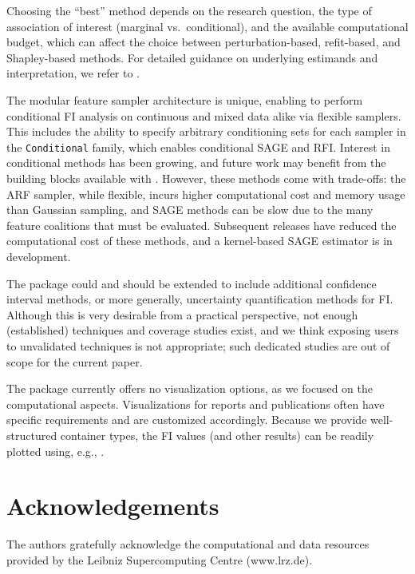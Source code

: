Choosing the ``best'' method depends on the research question, the type of association of interest (marginal vs.~conditional), and the available computational budget, which can affect the choice between perturbation-based, refit-based, and Shapley-based methods.
For detailed guidance on underlying estimands and interpretation, we refer to \citet{ewald2024guidefeatureb}.

The modular feature sampler architecture is unique, enabling  to perform conditional FI analysis on continuous and mixed data alike via flexible samplers.
This includes the ability to specify arbitrary conditioning sets for each sampler in the \texttt{Conditional} family, which enables conditional SAGE and RFI.
Interest in conditional methods has been growing, and future work may benefit from the building blocks available with .
However, these methods come with trade-offs: the ARF sampler, while flexible, incurs higher computational cost and memory usage than Gaussian sampling, and SAGE methods can be slow due to the many feature coalitions that must be evaluated.
Subsequent releases have reduced the computational cost of these methods, and a kernel-based SAGE estimator is in development.

The package could and should be extended to include additional confidence interval methods, or more generally, uncertainty quantification methods for FI.
Although this is very desirable from a practical perspective, not enough (established) techniques and coverage studies exist, and we think exposing users to unvalidated techniques is not appropriate; such dedicated studies are out of scope for the current paper.

The package currently offers no visualization options, as we focused on the computational aspects.
Visualizations for reports and publications often have specific requirements and are customized accordingly.
Because we provide well-structured container types, the FI values (and other results) can be readily plotted using, e.g., .

\section{Acknowledgements}\label{acknowledgements}

\setlength{\parindent}{0pt}

The authors gratefully acknowledge the computational and data resources provided by the Leibniz Supercomputing Centre (www.lrz.de).

